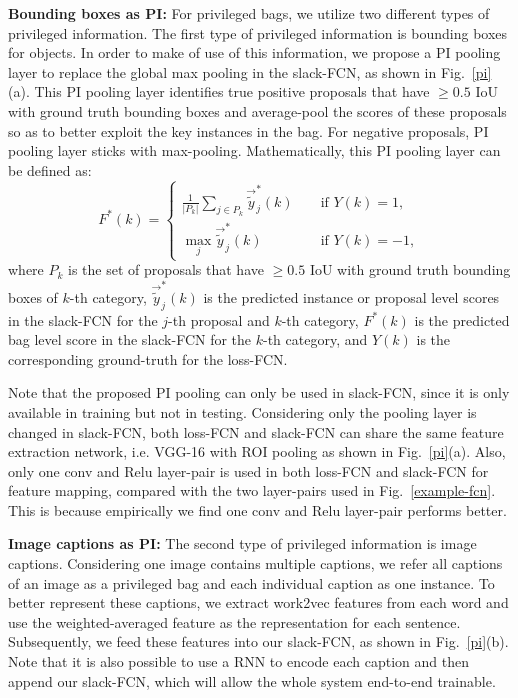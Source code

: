\documentclass[10pt,twocolumn,letterpaper]{article}
\begin{document}
\textbf{Bounding boxes as PI:} For privileged bags, we utilize two
different types of privileged information. The first type of
privileged information is bounding boxes for objects. In order to
make of use of this information, we propose a PI pooling layer to
replace the global max pooling in the slack-FCN, as shown in
Fig.~\ref{pi}(a). This PI pooling layer identifies true positive
proposals that have $\geq 0.5$ IoU with ground truth bounding
boxes and average-pool the scores of these proposals so as to
better exploit the key instances in the bag. For negative
proposals, PI pooling layer sticks with max-pooling.
Mathematically, this PI pooling layer can be defined as:
\begin{equation}
F^*(k) = \left\{\begin{matrix}

\frac{1}{|P_k|}\sum_{j\in P_k} {\vec{\tilde{y}}^*_{j}(k)} && \text{ if } Y(k) = 1,\\
\max_j\vec{\tilde{y}}^*_{j}(k) && \text{ if } Y(k) = -1,
\end{matrix}\right.
\end{equation}
where $P_k$ is the set of proposals that have $\geq 0.5$ IoU with
ground truth bounding boxes of $k$-th category,
$\vec{\tilde{y}}^*_{j}(k)$ is the predicted instance or proposal
level scores in the slack-FCN for the $j$-th proposal and $k$-th
category, $F^*(k)$ is the predicted bag level score in the
slack-FCN for the $k$-th category, and $Y(k)$ is the corresponding
ground-truth for the loss-FCN.

Note that the proposed PI pooling can only be used in slack-FCN,
since it is only available in training but not in testing.
Considering only the pooling layer is changed in slack-FCN, both
loss-FCN and slack-FCN can share the same feature extraction
network, i.e. VGG-16 with ROI pooling as shown in
Fig.~\ref{pi}(a). Also, only one conv and Relu layer-pair is used
in both loss-FCN and slack-FCN for feature mapping, compared with
the two layer-pairs used in Fig.~\ref{example-fcn}. This is
because empirically we find one conv and Relu layer-pair performs
better.


\textbf{Image captions as PI:} The second type of privileged
information is image captions. Considering one image contains
multiple captions, we refer all captions of an image as a
privileged bag and each individual caption as one instance. To
better represent these captions, we extract work2vec features from
each word and use the weighted-averaged feature as the
representation for each sentence. Subsequently, we feed these
features into our slack-FCN, as shown in Fig.~\ref{pi}(b). Note
that it is also possible to use a RNN to encode each caption and
then append our slack-FCN, which will allow the whole system
end-to-end trainable.
\end{document}
